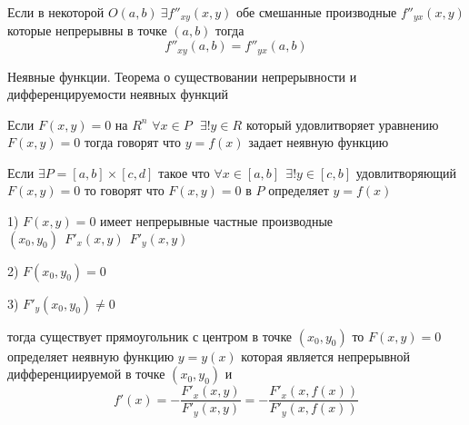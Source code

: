 \begin{theorem}
  Если в некоторой $O(a,b) ~ \exists f''_{xy}(x,y)$ обе смешанные производные
  $f''_{yx}(x,y)$ которые непрерывны в точке $(a,b)$ тогда
  $$
  f''_{xy}(a,b) = f''_{yx}(a,b)
  $$
\end{theorem}

\begin{title}[\Large]
  Неявные функции. Теорема о существовании непрерывности и дифференцируемости
  неявных функций
\end{title}

\begin{define}
  Если $F(x, y) = 0$ на $R^n$ $\forall x \in P ~~~ \exists! y \in R$ который
  удовлитворяет уравнению $F(x, y) = 0$ тогда говорят что $y = f(x)$
  задает неявную функцию

  Если $\exists P = [a,b] \times [c,d]$ такое что $\forall x \in [a,b] ~~
  \exists! y \in [c,b]$ удовлитворяющий $F(x,y) = 0$ то говорят что
  $F(x,y) = 0$ в $P$ определяет $y = f(x)$
\end{define}

\begin{theorem}

  1) $F(x, y) = 0$ имеет непрерывные частные производные $(x_0, y_0) ~~
  F'_x(x,y) ~~ F'_y(x,y)$

  2) $F(x_0, y_0) = 0$

  3) $F'_y(x_0, y_0) \not= 0$

  тогда существует прямоугольник с центром в точке $(x_0, y_0)$ то
  $F(x, y) = 0$ определяет неявную функцию $y = y(x)$ которая является
  непрерывной дифференциируемой в точке $(x_0, y_0)$ и
  $$
  f'(x) = - \frac{F'_x(x, y)}{F'_y(x, y)} = -
  \frac{F'_x(x, f(x))}{F'_y(x, f(x))}
  $$
\end{theorem}

